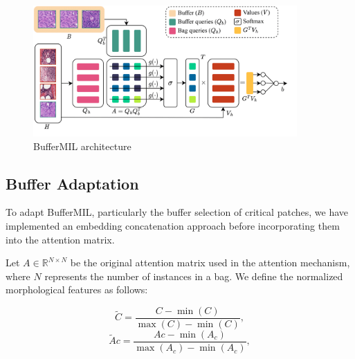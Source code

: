 \documentclass[10pt,twocolumn]{article}
\begin{document}

\begin{figure}[!htb]
\centering
\includegraphics[width=\linewidth, height=5cm]{images/buffermil.png}
\caption{BufferMIL architecture} 
\label{buffermil_arc}
\end{figure}

\subsection{Buffer Adaptation}



To adapt BufferMIL, particularly the buffer selection of critical patches, we have implemented an embedding concatenation approach before incorporating them into the attention matrix. 

Let $A \in \mathbb{R}^{N \times N}$ be the original attention matrix used in the attention mechanism, where $N$ represents the number of instances in a bag. We define the normalized morphological features as follows:

\begin{equation}
\tilde{C} = \frac{C - \min(C)}{\max(C) - \min(C)},
\end{equation}
\begin{equation}
\tilde{A}{c} = \frac{A{c} - \min(A_{c})}{\max(A_{c}) - \min(A_{c})},
\end{equation}
\end{document}
